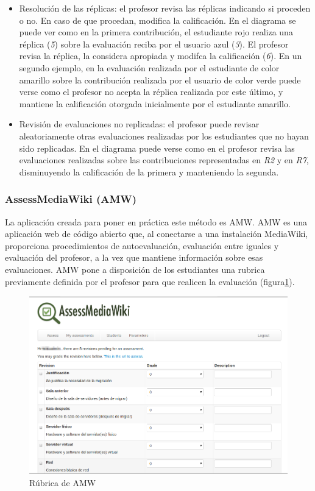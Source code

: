 \begin{itemize}
\item Resolución de las réplicas: el profesor revisa las réplicas indicando si proceden o no. En caso de que procedan, modifica la calificación. En el diagrama se puede ver como en la primera contribución, el estudiante rojo realiza una réplica (\emph{5}) sobre la evaluación reciba por el usuario azul (\emph{3}). El profesor revisa la réplica, la considera apropiada y modifca la calificación (\emph{6}). En un segundo ejemplo, en la evaluación realizada por el estudiante de color amarillo sobre la contribución realizada por el usuario de color verde puede verse como el profesor no acepta la réplica realizada por este último, y mantiene la calificación otorgada inicialmente por el estudiante amarillo.
\item Revisión de evaluaciones no replicadas: el profesor puede revisar aleatoriamente otras evaluaciones realizadas por los estudiantes que no hayan sido replicadas. En el diagrama puede verse como en el profesor revisa las evaluaciones realizadas sobre las contribuciones representadas en \emph{R2} y en \emph{R7}, disminuyendo la calificación de la primera y manteniendo la segunda.
\end{itemize}

\subsubsection{AssessMediaWiki (AMW)}

La aplicación creada para poner en práctica este método es AMW. AMW es una aplicación web de código abierto que, al conectarse a una instalación MediaWiki, proporciona procedimientos de autoevaluación, evaluación entre iguales y evaluación del profesor, a la vez que mantiene información sobre esas evaluaciones. AMW pone a disposición de los estudiantes una rubrica previamente definida por el profesor para que realicen la evaluación (figura\ref{fig:AmwRubrica}). 

\begin{figure}
  \begin{center}
    \includegraphics[scale=0.3]{AmwRubrica.png}
  \end{center}
  \caption{Rúbrica de AMW}
  \label{fig:AmwRubrica}
\end{figure}

